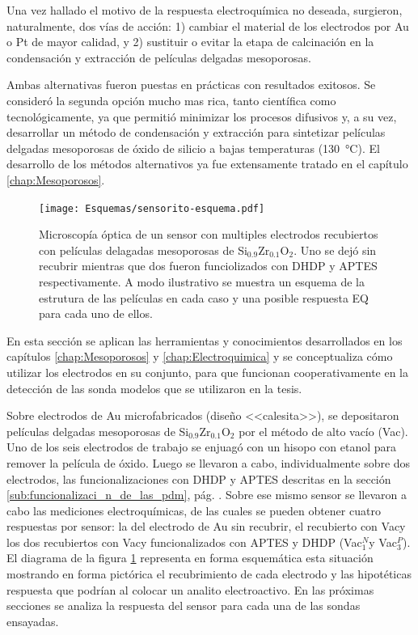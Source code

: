 {	Una vez hallado el motivo de la respuesta electroquímica no deseada, surgieron, naturalmente, dos vías de acción: 1) cambiar el material de los electrodos por Au o Pt de mayor calidad, y 2) sustituir o evitar la etapa de calcinación en la condensación y extracción de películas delgadas mesoporosas.

	Ambas alternativas fueron puestas en prácticas con resultados exitosos. Se consideró la segunda opción mucho mas rica, tanto científica como tecnológicamente, ya que permitió minimizar los procesos difusivos y, a su vez, desarrollar un método de condensación y extracción para sintetizar películas delgadas mesoporosas de óxido de silicio a bajas temperaturas (\SI{130}{\celsius}). El desarrollo de los métodos alternativos ya fue extensamente tratado en el capítulo \ref{chap:Mesoporosos}.

			\begin{figure}[ht!]
		 	       	\begin{center}
		 	       	\texttt{[image: Esquemas/sensorito-esquema.pdf]}
		        	\caption[Esquema de sensores EQ selectivos]{Microscopía óptica de un sensor con multiples electrodos recubiertos con películas delagadas mesoporosas de Si$_{0.9}$Zr$_{0.1}$O$_2$. Uno se dejó sin recubrir mientras que dos fueron funciolizados con DHDP y APTES respectivamente. A modo ilustrativo se muestra un esquema de la estrutura de las películas en cada caso y una posible respuesta EQ para cada uno de ellos.}
		         	\label{fig:sensor-calesita}
		         	\end{center}
		     		\end{figure}

    \pagebreak En esta sección se aplican las herramientas y conocimientos desarrollados en los capítulos \ref{chap:Mesoporosos} y \ref{chap:Electroquimica} y se conceptualiza cómo utilizar los electrodos en su conjunto, para que funcionan cooperativamente en la detección de las sonda modelos que se utilizaron en la tesis. 

	Sobre electrodos de Au microfabricados (diseño <<calesita>>), se depositaron películas delgadas mesoporosas de Si$_{0.9}$Zr$_{0.1}$O$_2$ por el método de alto vacío (Vac\pdmZ). Uno de los seis electrodos de trabajo se enjuagó con un hisopo con etanol para remover la película de óxido. Luego se llevaron a cabo, individualmente sobre dos electrodos, las funcionalizaciones con DHDP y APTES descritas en la sección \ref{sub:funcionalizaci_n_de_las_pdm}, pág. \pageref{sub:funcionalizaci_n_de_las_pdm}. Sobre ese mismo sensor se llevaron a cabo las mediciones electroquímicas, de las cuales se pueden obtener cuatro respuestas por sensor: la del electrodo de Au sin recubrir, el recubierto con Vac\pdmZ\space y los dos recubiertos con Vac\pdmZ\space y funcionalizados con APTES y DHDP (Vac\pdmZ$^N_1$\space y  Vac\pdmZ$^P_3$). El diagrama de la figura \ref{fig:sensor-calesita} representa en forma esquemática esta situación mostrando en forma pictórica el recubrimiento de cada electrodo y las hipotéticas respuesta que podrían al colocar un analito electroactivo. En las próximas secciones se analiza la respuesta del sensor para cada una de las sondas ensayadas.


}
